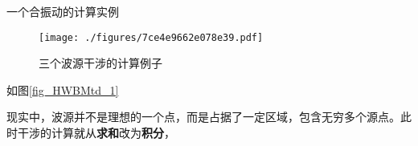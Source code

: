 \begin{example}{一个合振动的计算实例}

\begin{figure}[ht]
\centering
\texttt{[image: ./figures/7ce4e9662e078e39.pdf]}
\caption{三个波源干涉的计算例子} \label{fig_HWBMtd_1}
\end{figure}

如图\autoref{fig_HWBMtd_1} 

\end{example}




现实中，波源并不是理想的一个点，而是占据了一定区域，包含无穷多个源点。此时干涉的计算就从\textbf{求和}改为\textbf{积分}，






















